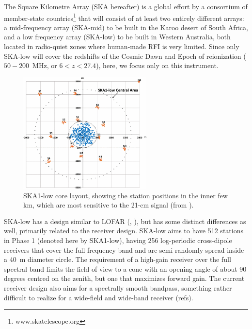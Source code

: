 The Square Kilometre Array (SKA hereafter) is a global effort by a consortium of member-state countries\footnote{www.skatelescope.org} that will consist of at least two entirely different arrays: a mid-frequency array  (SKA-mid) to be built in the Karoo desert of South Africa, and a low frequency array (SKA-low) to be built in Western Australia, both located in radio-quiet zones where human-made RFI is very limited. 
Since only SKA-low will cover the redshifts of the Cosmic Dawn and Epoch of reionization ($50-200$~MHz, or $6 < z < 27.4$), here, we focus only on this instrument. 
%
\begin{figure}[]
\begin{center}
\includegraphics[width=0.6\textwidth]{Koopmans_Bernardi/SKA-layout.png}
\end{center}
\caption{SKA1-low core layout, showing the station positions in the inner few km, which are most sensitive to the 21-cm signal (from \cite{waterson16}).}
\label{fig:fig_ska_layout}
\end{figure}
%
SKA-low has a design similar to LOFAR (\cite{mellema13}, \cite{koopmans15}), but has some distinct differences as well, primarily related to the receiver design. SKA-low aims to have 512 stations in Phase 1 (denoted here by SKA1-low), having 256 log-periodic cross-dipole receivers that cover the full frequency band and are semi-randomly spread inside a 40~m diameter circle. The requirement of a high-gain receiver over the full spectral band limits the field of view to a cone with an opening angle of about 90 degrees centred on the zenith, but one that maximizes forward gain. The current receiver design also aims for a spectrally smooth bandpass, something rather difficult to realize for a wide-field and wide-band receiver (refs).
